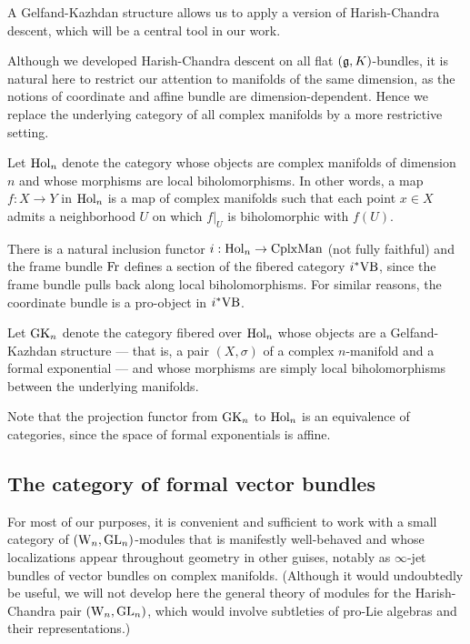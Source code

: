 A Gelfand-Kazhdan structure allows us to apply a version of Harish-Chandra descent, which will be a central tool in our work.

Although we developed Harish-Chandra descent on all flat $(\mathfrak g,K)$-bundles, 
it is natural here to restrict our attention to manifolds of the same dimension,
as the notions of coordinate and affine bundle are dimension-dependent.
Hence we replace the underlying category of all complex manifolds by a more restrictive setting.

\begin{dfn}
Let ${\rm Hol}_n$ denote the category whose objects are complex manifolds of dimension $n$ and whose morphisms are local biholomorphisms.
In other words, a map $f: X \to Y$ in ${\rm Hol}_n$ is a map of complex manifolds such that each point $x \in X$ admits a neighborhood $U$ on which $f|_U$ is biholomorphic with $f(U)$.
\end{dfn}

There is a natural inclusion functor $i : {\rm Hol}_n \to {\rm CplxMan}$ (not fully faithful) and the frame bundle ${\rm Fr}$ defines a section of the fibered category $i^*{\rm VB}$,
since the frame bundle pulls back along local biholomorphisms.
For similar reasons, the coordinate bundle is a pro-object in $i^*{\rm VB}$.

\begin{dfn}
Let ${\rm GK}_n$ denote the category fibered over ${\rm Hol}_n$ whose objects are a Gelfand-Kazhdan structure 
--- that is, a pair $(X, \sigma)$ of a complex $n$-manifold and a formal exponential ---
and whose morphisms are simply local biholomorphisms between the underlying manifolds.
\end{dfn}

Note that the projection functor from ${\rm GK}_n$ to ${\rm Hol}_n$ is an equivalence of categories, since the space of formal exponentials is affine.

\subsection{The category of formal vector bundles}

For most of our purposes, it is convenient and sufficient to work with a small category of $({{\rm W}_n},{\rm GL}_n)$-modules 
that is manifestly well-behaved and whose localizations appear throughout geometry in other guises, 
notably as $\infty$-jet bundles of vector bundles on complex manifolds.
(Although it would undoubtedly be useful, we will not develop here the general theory of modules for the Harish-Chandra pair $({{\rm W}_n},{\rm GL}_n)$, 
which would involve subtleties of pro-Lie algebras and their representations.)

